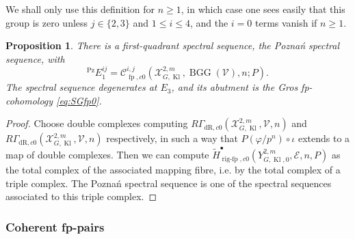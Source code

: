 \documentclass[cjm]{ipart}
\theoremstyle{plain}
\newtheorem{proposition}[theorem]{Proposition}
\theoremstyle{remark}
\DeclareMathOperator{\BGG}{BGG}
\DeclareMathOperator{\fp}{fp}
\DeclareMathOperator{\Kl}{Kl}
\DeclareMathOperator{\Pz}{Pz}
\DeclareMathOperator{\rigfp}{rig-fp}
\newcommand{\cE}{\mathcal{E}}
\newcommand{\cV}{\mathcal{V}}
\newcommand{\cX}{\mathcal{X}}
\newcommand{\dR}{\mathrm{dR}}
\newcommand{\sC}{\mathscr{C}}
\newcommand{\wH}{\widetilde{H}}
\numberwithin{equation}{subsection}
\renewcommand{\le}{\leqslant}
\renewcommand{\ge}{\geqslant}
\begin{document}
   \begin{remark}
    We shall only use this definition for $n \ge 1$, in which case one sees easily that this group is zero unless $j \in\{2,3\}$ and $1 \le i \le 4$, and the $i=0$ terms vanish if $n \ge 1$.
   \end{remark}

   \begin{proposition}\label{prop:Poznan}
    There is a first-quadrant spectral sequence, the \emph{Pozna\'n spectral sequence}, with
    \[ {}^{\Pz}E_1^{ij} = \sC^{i, j}_{\fp,c0}(\cX_{G,\Kl}^{2,m},\BGG(\cV), n; P). \]
    The spectral sequence degenerates at $E_3$, and its abutment is the Gros fp-cohomology \eqref{eq:SGfp0}.
   \end{proposition}

   \begin{proof}
    Choose double complexes computing $R\Gamma_{\dR, c0}(\cX_{G,\Kl}^{2,m}, \cV, n)$ and $R\Gamma_{\dR, c0}(\cX_{G,\Kl}^{2,m}, \cV, n)$ respectively, in such a way that $P(\varphi / p^n) \circ \iota$ extends to a map of double complexes. Then we can compute $\wH^{\bullet}_{\rigfp, c0}(Y_{G,\Kl,0}^{2,m},\cE, n, P)$ as the total complex of the associated mapping fibre, i.e. by the total complex of a triple complex.
    The Pozna\'n spectral sequence is one of the spectral sequences associated to this triple complex.
   \end{proof}



  \subsubsection*{Coherent fp-pairs}
\end{document}
